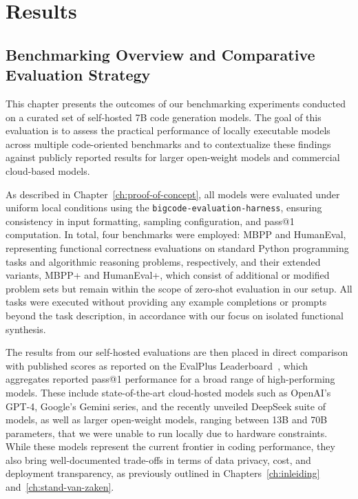 \chapter{Results}
\label{ch:results}

\section{Benchmarking Overview and Comparative Evaluation Strategy}

This chapter presents the outcomes of our benchmarking experiments conducted on a curated set of self-hosted 7B code generation models. The goal of this evaluation is to assess the practical performance of locally executable models across multiple code-oriented benchmarks and to contextualize these findings against publicly reported results for larger open-weight models and commercial cloud-based models.

As described in Chapter~\ref{ch:proof-of-concept}, all models were evaluated under uniform local conditions using the \texttt{bigcode-evaluation-harness}, ensuring consistency in input formatting, sampling configuration, and pass@1 computation. In total, four benchmarks were employed: \gls{MBPP} and HumanEval, representing functional correctness evaluations on standard Python programming tasks and algorithmic reasoning problems, respectively, and their extended variants, \gls{MBPP}+ and HumanEval+, which consist of additional or modified problem sets but remain within the scope of zero-shot evaluation in our setup. All tasks were executed without providing any example completions or prompts beyond the task description, in accordance with our focus on isolated functional synthesis.

The results from our self-hosted evaluations are then placed in direct comparison with published scores as reported on the EvalPlus Leaderboard~\autocite{evalplus_leaderboard}, which aggregates reported pass@1 performance for a broad range of high-performing models. These include state-of-the-art cloud-hosted models such as OpenAI’s GPT-4, Google’s Gemini series, and the recently unveiled DeepSeek suite of models, as well as larger open-weight models, ranging between 13B and 70B parameters, that we were unable to run locally due to hardware constraints. While these models represent the current frontier in coding performance, they also bring well-documented trade-offs in terms of data privacy, cost, and deployment transparency, as previously outlined in Chapters~\ref{ch:inleiding} and~\ref{ch:stand-van-zaken}.

